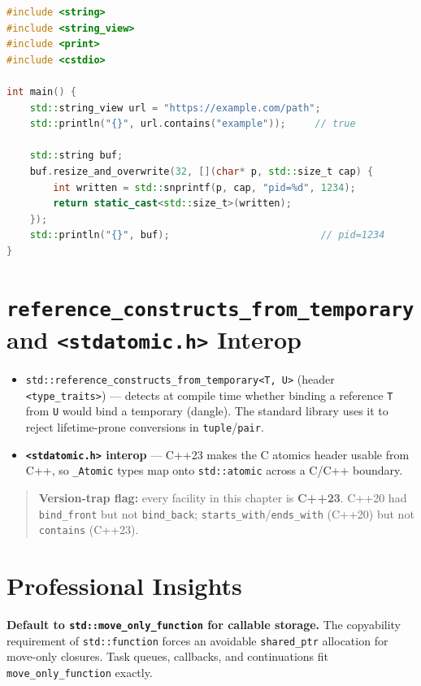 \begin{lstlisting}[language=C++, caption={Substring test and zero-copy buffer fill}]
#include <string>
#include <string_view>
#include <print>
#include <cstdio>

int main() {
    std::string_view url = "https://example.com/path";
    std::println("{}", url.contains("example"));     // true

    std::string buf;
    buf.resize_and_overwrite(32, [](char* p, std::size_t cap) {
        int written = std::snprintf(p, cap, "pid=%d", 1234);
        return static_cast<std::size_t>(written);
    });
    std::println("{}", buf);                          // pid=1234
}
\end{lstlisting}

\section{\texttt{reference\_constructs\_from\_temporary} and \texttt{<stdatomic.h>} Interop}

\begin{itemize}
    \item \lstinline|std::reference_constructs_from_temporary<T, U>| (header \lstinline|<type_traits>|) --- detects at compile time whether binding a reference \lstinline|T| from \lstinline|U| would bind a temporary (dangle). The standard library uses it to reject lifetime-prone conversions in \lstinline|tuple|/\lstinline|pair|.
    \item \textbf{\lstinline|<stdatomic.h>| interop} --- C++23 makes the C atomics header usable from C++, so \lstinline|_Atomic| types map onto \lstinline|std::atomic| across a C/C++ boundary.
\end{itemize}

\begin{quote}
\textbf{Version-trap flag:} every facility in this chapter is \textbf{C++23}. C++20 had \lstinline|bind_front| but not \lstinline|bind_back|; \lstinline|starts_with|/\lstinline|ends_with| (C++20) but not \lstinline|contains| (C++23).
\end{quote}

\section{Professional Insights}

\textbf{Default to \lstinline|std::move_only_function| for callable storage.} The copyability requirement of \lstinline|std::function| forces an avoidable \lstinline|shared_ptr| allocation for move-only closures. Task queues, callbacks, and continuations fit \lstinline|move_only_function| exactly.

